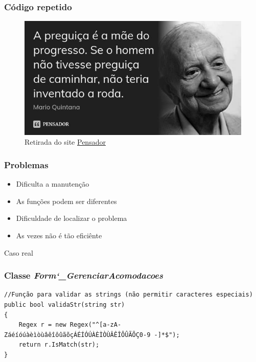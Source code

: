 \begin{frame}
	\frametitle{Código repetido}

	\begin{figure}[h]
		\centering
			\includegraphics[height=0.6\paperheight]{figuras/mario}
		\caption{Retirada do site \href{https://www.pensador.com/frase/MTY2/}{Pensador}}\label{figure:mario}
	\end{figure}

\end{frame}


\begin{frame}
	\frametitle{Problemas}

	\begin{itemize}
		\item Dificulta a manutenção
		\item As funções podem ser diferentes
		\item Dificuldade de localizar o problema
		\item As vezes não é tão eficiênte
	\end{itemize}

\end{frame}

\begin{frame}
	\Huge Caso real
\end{frame}

\begin{frame}[fragile]
	\frametitle{Classe \textit{Form\char`_GerenciarAcomodacoes}}

	\begin{verbatim}
//Função para validar as strings (não permitir caracteres especiais)
public bool validaStr(string str)
{
	Regex r = new Regex("^[a-zA-ZáéíóúàèìòùâêîôûãõçÁÉÍÓÚÀÈÌÒÙÂÊÎÔÛÃÕÇ0-9 -]*$");
    return r.IsMatch(str);
}
\end{verbatim}

\end{frame}

